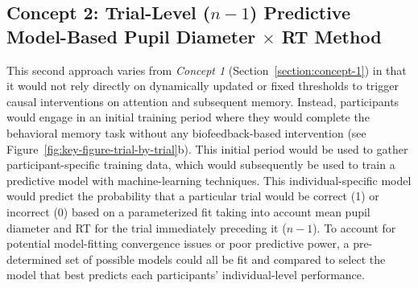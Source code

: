 \subsection{Concept 2: Trial-Level ($n - 1$) Predictive Model-Based Pupil Diameter $\times$ RT Method}\label{section:concept-2}

This second approach varies from \emph{Concept 1} (Section~\ref{section:concept-1}) in that it would not rely directly on dynamically updated or fixed thresholds to trigger causal interventions on attention and subsequent memory. Instead, participants would engage in an initial training period where they would complete the behavioral memory task without any biofeedback-based intervention (see Figure~\ref{fig:key-figure-trial-by-trial}b). This initial period would be used to gather participant-specific training data, which would subsequently be used to train a predictive model with machine-learning techniques. This individual-specific model would predict the probability that a particular trial would be correct (1) or incorrect (0) based on a parameterized fit taking into account mean pupil diameter and RT for the trial immediately preceding it ($n - 1$). To account for potential model-fitting convergence issues or poor predictive power, a pre-determined set of possible models could all be fit and compared to select the model that best predicts each participants' individual-level performance.

